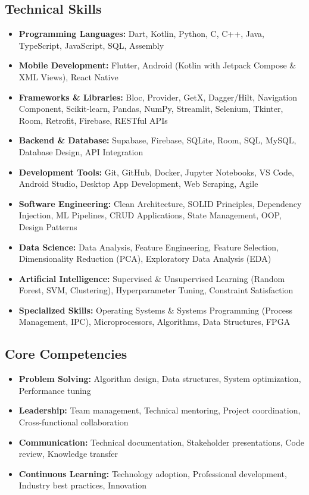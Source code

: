 \documentclass[10pt, letterpaper]{article}
\newenvironment{highlights}{
\begin{itemize}[
topsep=0.10 cm,
parsep=0.10 cm,
partopsep=0pt,
itemsep=0pt,
leftmargin=0 cm + 10pt
]
}{
\end{itemize}
} %
\begin{document}
\vspace{0.2 cm}

\begin{samepage}
\section{Technical Skills}
\vspace{0.1cm}
\begin{highlights}
\item \textbf{Programming Languages:} Dart, Kotlin, Python, C, C++, Java, TypeScript, JavaScript, SQL, Assembly
\item \textbf{Mobile Development:} Flutter, Android (Kotlin with Jetpack Compose \& XML Views), React Native
\item \textbf{Frameworks \& Libraries:} Bloc, Provider, GetX, Dagger/Hilt, Navigation Component, Scikit-learn, Pandas, NumPy, Streamlit, Selenium, Tkinter, Room, Retrofit, Firebase, RESTful APIs
\item \textbf{Backend \& Database:} Supabase, Firebase, SQLite, Room, SQL, MySQL, Database Design, API Integration
\item \textbf{Development Tools:} Git, GitHub, Docker, Jupyter Notebooks, VS Code, Android Studio, Desktop App Development, Web Scraping, Agile
\item \textbf{Software Engineering:} Clean Architecture, SOLID Principles, Dependency Injection, ML Pipelines, CRUD Applications, State Management, OOP, Design Patterns
\item \textbf{Data Science:} Data Analysis, Feature Engineering, Feature Selection, Dimensionality Reduction (PCA), Exploratory Data Analysis (EDA)
\item \textbf{Artificial Intelligence:} Supervised \& Unsupervised Learning (Random Forest, SVM, Clustering), Hyperparameter Tuning, Constraint Satisfaction
\item \textbf{Specialized Skills:} Operating Systems \& Systems Programming (Process Management, IPC), Microprocessors, Algorithms, Data Structures, FPGA
\end{highlights}
\end{samepage}

\begin{samepage}
\section{Core Competencies}
\vspace{0.1cm}

\begin{highlights}
\item \textbf{Problem Solving:} Algorithm design, Data structures, System optimization, Performance tuning
\item \textbf{Leadership:} Team management, Technical mentoring, Project coordination, Cross-functional collaboration
\item \textbf{Communication:} Technical documentation, Stakeholder presentations, Code review, Knowledge transfer
\item \textbf{Continuous Learning:} Technology adoption, Professional development, Industry best practices, Innovation
\end{highlights}
\end{samepage}
\end{document}
